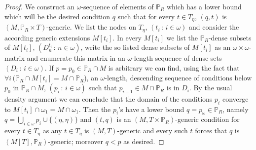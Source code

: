 \documentclass[10pt,a4paper]{amsart}
\newcommand{\forceP}{\mathbb{P}}
\begin{document}
\begin{proof}
 We construct an $\omega$-sequence of elements of $\forceP_R$ which has a lower bound
 which will be the desired condition $q$ such that for every $t \in T_{\eta}$, $(q,t)$ is $(M, \forceP_R \times T)$-generic. 
 We list the nodes on $T_{\eta}$, $(t_i \, : \, i \in \omega)$ and
 consider the according generic extensions $M[t_i]$.
 In every $M[t_i]$ we list the $\forceP_R$-dense subsets of $M[t_i]$,
 $(D^{t_i}_n \, : \, n \in \omega)$, write 
 the so listed dense subsets of $M[t_i]$ as an $\omega \times \omega$-matrix and enumerate
 this matrix in an $\omega$-length sequence of dense sets $(D_i \, : \, i \in \omega)$.
 If $p=p_0 \in \forceP_R \cap M$ is arbitrary we can find, using the fact that $\forall i \, (\forceP_R \cap M[t_i] = M \cap \forceP_R$), an $\omega$-length, descending
 sequence of conditions below $p_0$ in $\forceP_R \cap M$, $(p_i \, : \, i \in \omega)$
 such that $p_{i+1} \in M \cap \forceP_R$ is in $D_i$.
 By the usual density argument we can conclude that the domain of the conditions $p_i$ converge to $M[t_i] \cap \omega_1=M \cap \omega_1$.
 Then the $p_i$'s have a lower bound $q=p_{\omega} \in \forceP_R$, namely $q= \bigcup_{i \in \omega} p_i \cup \{(\eta, \eta)\}$  and $(t, q)$ is an
 $(M, T \times \forceP_R)$-generic condition for every $t \in T_{\eta}$ as any $t \in T_{\eta}$ is $(M,T)$-generic
 and every such $t$ forces that $q$ is $(M[T], \forceP_R)$-generic; moreover $q < p$ as 
 desired.
 \end{proof}
\end{document}

